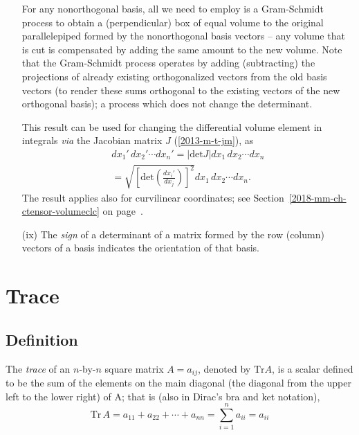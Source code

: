 \begin{itemize}
{For any nonorthogonal basis, all we need to employ is a Gram-Schmidt process
to obtain a (perpendicular) box of equal volume to the original parallelepiped
formed by the nonorthogonal basis vectors --
any volume that is cut is compensated by adding the same amount to the new volume.
Note that the Gram-Schmidt process operates by adding (subtracting) the projections
of already existing orthogonalized vectors
from the old basis vectors (to render these sums orthogonal to the existing vectors of the new orthogonal basis);
a process which does not change the determinant.
\eproof
}

This result can be used for changing the differential volume element in integrals {\it via} the Jacobian matrix
$J
$
(\ref{2013-m-t-jm}), as
\begin{equation}
\begin{split}
dx_1'\, dx_2' \cdots dx_n'
= \vert \textrm{det} J \vert dx_1\, dx_2 \cdots dx_n     \\
= \sqrt{\left[\text{det}\left(\frac{dx_i'}{dx_j}\right)\right]^2} dx_1\, dx_2 \cdots dx_n
.
\end{split}
\label{2018-mm-ch-fdvs-jacoinfvol}
\end{equation}
The result applies also for curvilinear coordinates; see Section~\ref{2018-mm-ch-ctensor-volumeclc}
on page~\pageref{2018-mm-ch-ctensor-volumeclc}.

\item[(ix)]
The {\em sign} of a  determinant of a matrix formed by the row (column)
 vectors of a basis indicates the {orientation}
of that basis.

\end{itemize}


\section{Trace}
\label{2013-ch-fdvs-trace}

\subsection{Definition}
The {\em trace} of an $n$-by-$n$ square matrix $A=a_{ij}$, denoted by
$\textrm{Tr} A$,  is a scalar
defined to be the sum of the elements on the main diagonal
 (the diagonal from the upper left to the lower right) of A; that is  (also in Dirac's bra and ket notation),
\begin{equation}
\textrm{Tr}\,A
= a_{11} +a_{22}+ \cdots +a_{nn}
=\sum_{i=1}^n a_{ii}
=  a_{ii}%
\end{equation}

